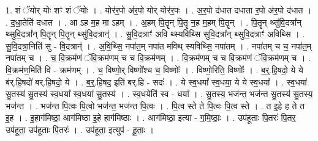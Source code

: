 \documentclass[17pt]{extarticle}
\begin{document}
1. शं ॅयोर् योः शꣳ शं ॅयोः । . योर॑र॒पो अ॑र॒पो योर् योर॑र॒पः । . अ॒र॒पो द॑धात दधाता र॒पो अ॑र॒पो द॑धात । . द॒धा॒तेति॑ दधात । . आ ऽह म॒ह मा ऽहम् । . अ॒हम् पि॒तॄन् पि॒तॄ न॒ह म॒हम् पि॒तॄन् । . पि॒तॄन् थ्सु॑वि॒दत्रा᳚न् थ्सुवि॒दत्रा᳚न् पि॒तॄन् पि॒तॄन् थ्सु॑वि॒दत्रान्॑ । . सु॒वि॒दत्राꣳ॑ अवि थ्स्यविथ्सि सुवि॒दत्रा᳚न् थ्सुवि॒दत्राꣳ॑ अविथ्सि । . सु॒वि॒दत्रा॒निति॑ सु - वि॒दत्रान्॑ । . अ॒वि॒थ्सि॒ नपा॑त॒म् नपा॑त मविथ् स्यविथ्सि॒ नपा॑तम् । . नपा॑तम् च च॒ नपा॑त॒म् नपा॑तम् च । . च॒ वि॒क्रम॑णं ॅवि॒क्रम॑णम् च च वि॒क्रम॑णम् । . वि॒क्रम॑णम् च च वि॒क्रम॑णं ॅवि॒क्रम॑णम् च । . वि॒क्रम॑ण॒मिति॑ वि - क्रम॑णम् । . च॒ विष्णो॒र् विष्णो᳚श्च च॒ विष्णोः᳚ । . विष्णो॒रिति॒ विष्णोः᳚ । . ब॒र्॒.हि॒षदो॒ ये ये ब॑र्.हि॒षदो॑ बर्.हि॒षदो॒ ये । . ब॒र्॒.हि॒षद॒ इति॑ बर्.हि - सदः॑ । . ये स्व॒धया᳚ स्व॒धया॒ ये ये स्व॒धया᳚ । . स्व॒धया॑ सु॒तस्य॑ सु॒तस्य॑ स्व॒धया᳚ स्व॒धया॑ सु॒तस्य॑ । . स्व॒धयेति॑ स्व - धया᳚ । . सु॒तस्य॒ भज॑न्त॒ भज॑न्त सु॒तस्य॑ सु॒तस्य॒ भज॑न्त । . भज॑न्त पि॒त्वः पि॒त्वो भज॑न्त॒ भज॑न्त पि॒त्वः । . पि॒त्व स्ते ते पि॒त्वः पि॒त्व स्ते । . त इ॒हे ह ते त इ॒ह । . इ॒हाग॑मिष्ठा॒ आग॑मिष्ठा इ॒हे हाग॑मिष्ठाः । . आग॑मिष्ठा॒ इत्या - ग॒मि॒ष्ठाः॒ । . उप॑हूताः पि॒तरः॑ पि॒तर॒ उप॑हूता॒ उप॑हूताः पि॒तरः॑ । . उप॑हूता॒ इत्युप॑ - हू॒ताः॒ । \newline
\end{document}
